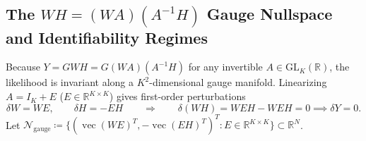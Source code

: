\documentclass[11pt,a4paper]{article}
\theoremstyle{plain}
\theoremstyle{definition}
\theoremstyle{remark}
\newcommand{\R}{\mathbb{R}}
\newcommand{\cN}{\mathcal{N}}
\newcommand{\vecop}{\operatorname{vec}}
\begin{document}
\subsection{The \texorpdfstring{$WH = (WA)(A^{-1}H)$}{WH = (WA)(A\^{}-1 H)} Gauge Nullspace and Identifiability Regimes}
Because $Y = GWH = G(WA)(A^{-1}H)$ for any invertible $A \in \mathrm{GL}_K(\R)$, the likelihood is invariant along a $K^2$-dimensional gauge manifold. Linearizing $A = I_K + E$ ($E \in \R^{K \times K}$) gives first-order perturbations
\begin{equation}
\label{eq:gauge_tangent}
\delta W = W E, \qquad \delta H = -E H \qquad \Longrightarrow \qquad \delta(WH) = W E H - W E H = 0 \implies \delta Y = 0.
\end{equation}
Let $\cN_{\text{gauge}} \coloneqq \{ (\vecop(WE)^T, -\vecop(EH)^T)^T : E \in \R^{K \times K} \} \subset \R^N$.
\end{document}
